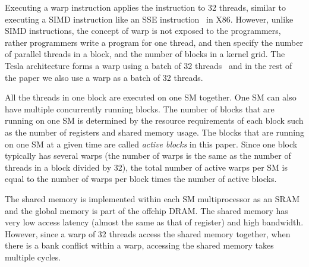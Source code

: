 \ignore
		{
		Executing a warp instruction applies the instruction to 32 threads, similar to
		executing a SIMD instruction like an SSE instruction~\cite{sse} in X86.
		However, unlike SIMD instructions, the concept of warp is not exposed to the
		programmers, rather programmers write a program for one thread, and then
		specify the number of parallel threads in a block, and the number of blocks
		in a kernel grid. The Tesla architecture forms a warp using a batch of 32
		threads~\cite{cuda:course, sc2008_cuda} and in the rest of the paper we also
		use a warp as a batch of 32 threads.

		All the threads in one block are executed on one SM together. One SM
		can also have multiple concurrently running blocks. The number of
		blocks that are running on one SM is determined by the resource
		requirements of each block such as the number of registers and shared
		memory usage. The blocks that are running on one SM at a given time
		are called {\em active blocks} in this paper. Since one block
		typically has several warps (the number of warps is the same as the
		number of threads in a block divided by 32), the total number of
		active warps per SM is equal to the number of warps per block times
		the number of active blocks.

		The shared memory is implemented within each SM multiprocessor as an
		SRAM and the global memory is part of the offchip DRAM. The shared
		memory has very low access latency (almost the same as that of
		register) and high bandwidth. However, since a warp of 32 threads
		access the shared memory together, when there is a bank conflict
		within a warp, accessing the shared memory takes multiple cycles.
		}


